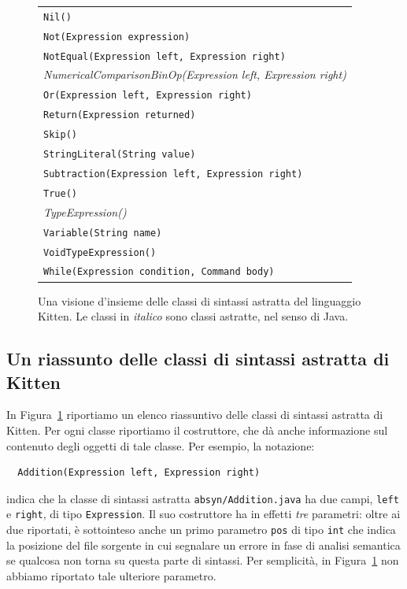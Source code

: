 \begin{figure}
\begin{center}
{\begin{tabular}{l}
\texttt{Nil()} \\
\texttt{Not(Expression expression)} \\
\texttt{NotEqual(Expression left, Expression right)} \\
\textit{NumericalComparisonBinOp(Expression left, Expression right)} \\
\texttt{Or(Expression left, Expression right)} \\
\texttt{Return(Expression returned)} \\
\texttt{Skip()} \\
\texttt{StringLiteral(String value)} \\
\texttt{Subtraction(Expression left, Expression right)} \\
\texttt{True()} \\
\textit{TypeExpression()} \\
\texttt{Variable(String name)} \\
\texttt{VoidTypeExpression()} \\
\texttt{While(Expression condition, Command body)}
\end{tabular}
}
\end{center}
\caption{Una visione d'insieme delle classi di sintassi astratta del linguaggio Kitten. Le classi in \emph{italico} sono classi astratte, nel senso di Java.}
  \label{fig:abstract_classes}
\end{figure}
%
\subsection{Un riassunto delle classi di sintassi astratta di Kitten}
  \label{subsec:abstract_classes}
%
In Figura~\ref{fig:abstract_classes} riportiamo un elenco riassuntivo delle
classi di sintassi astratta di Kitten. Per ogni classe riportiamo il
costruttore, che d\`a anche informazione sul contenuto degli oggetti di tale
classe. Per esempio, la notazione:
%
\begin{verbatim}
  Addition(Expression left, Expression right)
\end{verbatim}
%
indica che la classe di sintassi astratta \texttt{absyn/Addition.java}
ha due campi, \texttt{left} e \texttt{right}, di tipo
\texttt{Expression}. Il suo costruttore ha in effetti \emph{tre} parametri:
oltre ai due riportati, \`e sottointeso anche un primo parametro \texttt{pos}
di tipo \texttt{int} che indica la posizione del file sorgente in cui segnalare
un errore in fase di analisi semantica se qualcosa non torna su questa parte
di sintassi. Per semplicit\`a, in Figura~\ref{fig:abstract_classes}
non abbiamo riportato tale ulteriore parametro.


